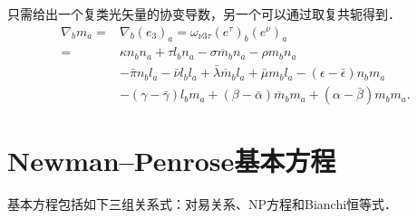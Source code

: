 只需给出一个复类光矢量的协变导数，另一个可以通过取复共轭得到．
\begin{equation}\label{chnull:eqn_covD-m}
    \begin{aligned}
        \nabla_{b} m_a =& \nabla_{b} (e_3)_a =
        \omega_{\nu 3 \tau}(e^\tau)_b (e^\nu)_a  \\
        =&\kappa n_b n_a + \tau l_b n_a
        -\sigma \overline{m}_b n_a - \rho m_b n_a  \\
        & -\bar{\pi} n_b l_a  -\bar{\nu}l_b l_a
        +\bar{\lambda}\overline{m}_b l_a  + \bar{\mu}m_b l_a
        -(\epsilon-\bar{\epsilon})n_b m_a \\
        &  -(\gamma-\bar{\gamma})l_b m_a
        + (\beta-\bar{\alpha})\overline{m}_b m_a+(\alpha-\bar{\beta})m_b m_a .
    \end{aligned}
\end{equation}




\section{Newman--Penrose基本方程}\label{chnull:sec_NP2}
基本方程包括如下三组关系式：对易关系、NP方程和Bianchi恒等式．
